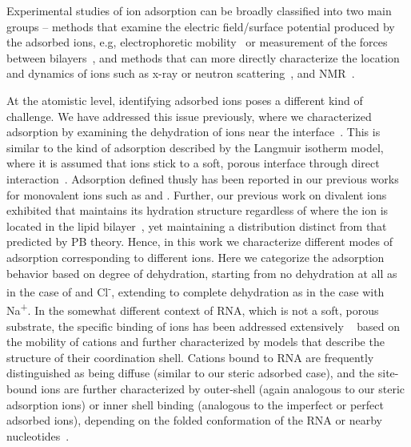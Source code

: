 Experimental studies of ion adsorption can be broadly
classified into two main groups -- methods that examine the electric field/surface potential
produced by the adsorbed ions, e.g, electrophoretic mobility~\cite{smith:2017:zeta} or 
measurement of the forces between 
bilayers~\cite{marra:1985:direct}, and methods
that can more directly characterize the location and dynamics of ions such 
as x-ray or neutron 
scattering~\cite{fogarty:2015,nagle:2000,pan:2012,panff:2012,uhrikova:2008,mason:2006:neutron}, and
NMR~\cite{nagle:2000,venable:2013,casal:1989}. 

At the atomistic level, identifying adsorbed ions poses a different kind of challenge.
We have addressed this issue previously,
where we characterized adsorption by examining the dehydration of ions near the
interface~\cite{kruczek:2019,kruczek:2017,pandit:2003:dppc:na,Berkowitz:2006}.
This is similar to the kind of adsorption described 
by the Langmuir isotherm model, where it is
assumed that ions stick to a soft, porous interface 
through direct interaction~\cite{kalinin:1996:ionbinding}.
Adsorption defined thusly has been reported in our previous works for monovalent ions 
such as \na and {\li{}}\cite{kruczek:2017,kruczek:2019,saunders:2019,saunders:2022}.
Further, our previous work on divalent ions
exhibited that \mg maintains its 
hydration {structure} regardless of where the ion is located in the 
lipid bilayer~\cite{kruczek:2019}, yet maintaining 
a distribution distinct from that
predicted by PB theory. Hence, {in this work
    we characterize different modes of adsorption corresponding
to different ions. Here we} categorize the 
adsorption behavior based on degree of 
dehydration, starting from no
dehydration at all as in the case of \mg and Cl\textsuperscript{-}, 
extending to complete dehydration as in the case with Na\textsuperscript{+}. 
In {the somewhat different} 
context of RNA, which is not a soft, 
porous substrate, the specific binding of ions has been addressed
extensively
~\cite{bowman:2012,rulivsek:2003:outer,dudev:2003,porschke:1979:mode,petrov:2005}
based on the mobility of cations and further 
characterized by models that describe the 
structure of their coordination shell.
Cations bound to RNA are frequently distinguished as
being diffuse {(similar to our steric adsorbed case)}, and the site-bound ions are further characterized
by outer-shell {(again analogous to our steric adsorption ions)} 
or inner shell binding 
{(analogous to the imperfect or perfect adsorbed ions)}, depending on
the folded conformation of the RNA or 
nearby nucleotides~\cite{bowman:2012,rulivsek:2003:outer,dudev:2003,porschke:1979:mode,petrov:2005}. 

